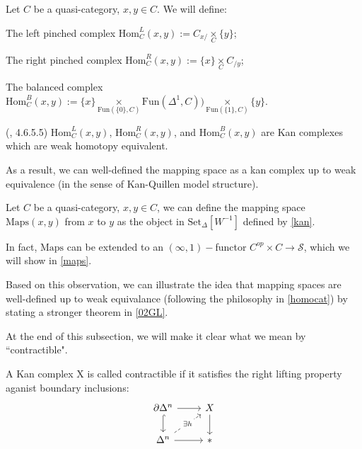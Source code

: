 \begin{definition}
    Let $C$ be a quasi-category, $x,y\in C$. We will define:
    
    The left pinched complex $\text{Hom}_C^L(x,y):=C_{x/}\underset{C}{\times} \{y\}$;

    The right pinched complex $\text{Hom}_C^R(x,y):=\{x\}\underset{C}{\times} C_{/y}$;

    The balanced complex $\text{Hom}_C^B(x,y):=\{x\}\underset{\text{Fun}(\{0\},C)}{\times}\text{Fun}(\Delta^1,C))\underset{\text{Fun}(\{1\},C)}{\times}\{y\}$. 
\end{definition}

\begin{theorem}(\textcite{ker}, 4.6.5.5)\label{kan}
    $\text{Hom}_C^L(x,y)$, $\text{Hom}_C^R(x,y)$, and $\text{Hom}_C^B(x,y)$ are Kan complexes which are weak homotopy equivalent. 
\end{theorem}

As a result, we can well-defined the mapping space as a kan complex up to weak equivalence (in the sense of Kan-Quillen model structure).

\begin{definition}
    Let $C$ be a quasi-category, $x,y \in C$, we can define the mapping space $\text{Maps}(x,y)$ from $x$ to $y$ as the object in $\text{Set}_\Delta[W^{-1}]$ defined by \ref{kan}.
\end{definition}

In fact, $\text{Maps}$ can be extended to an $(\infty,1)-$functor $C^{op}\times C\to \mathscr{S}$, which we will show in \ref{maps}.

Based on this observation, we can illustrate the idea that mapping spaces are well-defined up to weak equivalance (following the philosophy in \ref{homocat}) by stating a stronger theorem in \ref{02GL}.


At the end of this subsection, we will make it clear what we mean by ``contractible".

\begin{definition}
    A Kan complex X is called contractible if it satisfies the right lifting property aganist boundary inclusions:
\[
\begin{tikzcd}
\partial \Delta^n \arrow[r] \arrow[d, hook] & X \arrow[d] \\
\Delta^n \arrow[r] \arrow[ur, dashed, "\exists h" description] & \ast
\end{tikzcd}
\] 
\end{definition}

